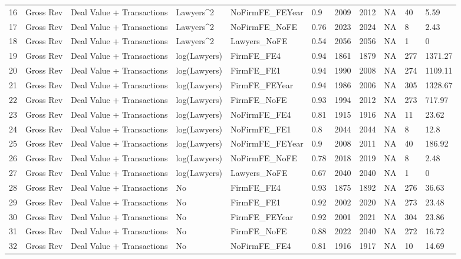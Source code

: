 \documentclass{article}
\begin{document}
\begin{table}[H]
\begin{tabular}{rllllllllll}
  16 & Gross Rev & Deal Value + Transactions & Lawyers^2 & NoFirmFE\_FEYear & 0.9 & 2009 & 2012 & NA & 40 & 5.59 \\ 
  17 & Gross Rev & Deal Value + Transactions & Lawyers^2 & NoFirmFE\_NoFE & 0.76 & 2023 & 2024 & NA & 8 & 2.43 \\ 
  18 & Gross Rev & Deal Value + Transactions & Lawyers^2 & Lawyers\_NoFE & 0.54 & 2056 & 2056 & NA & 1 & 0 \\ 
  19 & Gross Rev & Deal Value + Transactions & log(Lawyers) & FirmFE\_FE4 & 0.94 & 1861 & 1879 & NA & 277 & 1371.27 \\ 
  20 & Gross Rev & Deal Value + Transactions & log(Lawyers) & FirmFE\_FE1 & 0.94 & 1990 & 2008 & NA & 274 & 1109.11 \\ 
  21 & Gross Rev & Deal Value + Transactions & log(Lawyers) & FirmFE\_FEYear & 0.94 & 1986 & 2006 & NA & 305 & 1328.67 \\ 
  22 & Gross Rev & Deal Value + Transactions & log(Lawyers) & FirmFE\_NoFE & 0.93 & 1994 & 2012 & NA & 273 & 717.97 \\ 
  23 & Gross Rev & Deal Value + Transactions & log(Lawyers) & NoFirmFE\_FE4 & 0.81 & 1915 & 1916 & NA & 11 & 23.62 \\ 
  24 & Gross Rev & Deal Value + Transactions & log(Lawyers) & NoFirmFE\_FE1 & 0.8 & 2044 & 2044 & NA & 8 & 12.8 \\ 
  25 & Gross Rev & Deal Value + Transactions & log(Lawyers) & NoFirmFE\_FEYear & 0.9 & 2008 & 2011 & NA & 40 & 186.92 \\ 
  26 & Gross Rev & Deal Value + Transactions & log(Lawyers) & NoFirmFE\_NoFE & 0.78 & 2018 & 2019 & NA & 8 & 2.48 \\ 
  27 & Gross Rev & Deal Value + Transactions & log(Lawyers) & Lawyers\_NoFE & 0.67 & 2040 & 2040 & NA & 1 & 0 \\ 
  28 & Gross Rev & Deal Value + Transactions & No & FirmFE\_FE4 & 0.93 & 1875 & 1892 & NA & 276 & 36.63 \\ 
  29 & Gross Rev & Deal Value + Transactions & No & FirmFE\_FE1 & 0.92 & 2002 & 2020 & NA & 273 & 23.48 \\ 
  30 & Gross Rev & Deal Value + Transactions & No & FirmFE\_FEYear & 0.92 & 2001 & 2021 & NA & 304 & 23.86 \\ 
  31 & Gross Rev & Deal Value + Transactions & No & FirmFE\_NoFE & 0.88 & 2022 & 2040 & NA & 272 & 16.72 \\ 
  32 & Gross Rev & Deal Value + Transactions & No & NoFirmFE\_FE4 & 0.81 & 1916 & 1917 & NA & 10 & 14.69 \\ 

\end{tabular}
\end{table}
\end{document}
